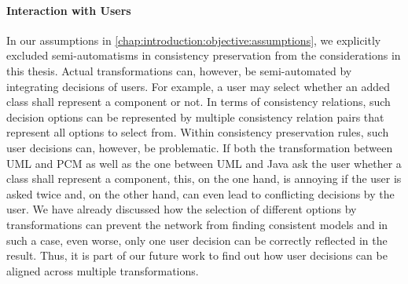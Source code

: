\paragraph{Interaction with Users}
In our assumptions in \autoref{chap:introduction:objective:assumptions}, we explicitly excluded semi-automatisms in consistency preservation from the considerations in this thesis.
Actual transformations can, however, be semi-automated by integrating decisions of users.
For example, a user may select whether an added class shall represent a component or not.
In terms of consistency relations, such decision options can be represented by multiple consistency relation pairs that represent all options to select from.
Within consistency preservation rules, such user decisions can, however, be problematic.
If both the transformation between \gls{UML} and \gls{PCM} as well as the one between \gls{UML} and Java ask the user whether a class shall represent a component, this, on the one hand, is annoying if the user is asked twice and, on the other hand, can even lead to conflicting decisions by the user.
We have already discussed how the selection of different options by transformations can prevent the network from finding consistent models and in such a case, even worse, only one user decision can be correctly reflected in the result.
Thus, it is part of our future work to find out how user decisions can be aligned across multiple transformations.


